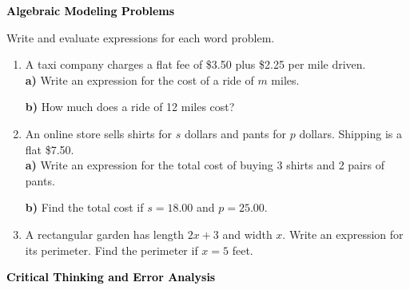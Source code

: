 \documentclass[12pt, letterpaper, fleqn]{article}
\begin{document}
\newpage

\begin{tcolorbox}[colback=black!10]
\large\textcolor{black}{\textbf{Algebraic Modeling Problems}}
\end{tcolorbox}

\noindent
Write and evaluate expressions for each word problem.

\vspace{3mm}

\begin{enumerate}[itemsep=1.5cm, leftmargin=0.6cm]

\item A taxi company charges a flat fee of \$3.50 plus \$2.25 per mile driven. \\
\textbf{a)} Write an expression for the cost of a ride of $m$ miles.  \vspace{1.5cm}

\textbf{b)} How much does a ride of 12 miles cost? 

\vspace{1cm}

\item An online store sells shirts for $s$ dollars and pants for $p$ dollars. Shipping is a flat \$7.50. \\

\textbf{a)} Write an expression for the total cost of buying 3 shirts and 2 pairs of pants. \\
\vspace{1.5cm}

\textbf{b)} Find the total cost if $s = 18.00$ and $p = 25.00$. 

\vspace{1.5cm}

\item A rectangular garden has length $2x + 3$ and width $x$. Write an expression for its perimeter. Find the perimeter if $x = 5$ feet.

\vspace{2cm}

\end{enumerate}

\newpage

\begin{tcolorbox}[colback=black!10]
\large\textcolor{black}{\textbf{Critical Thinking and Error Analysis}}
\end{tcolorbox}
\end{document}
